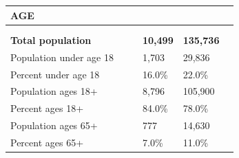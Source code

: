 \documentclass[9pt]{report}
\begin{document}
\vspace{24pt}
\setlength{\tabcolsep}{.01in} %
\begin{tabular}{p{.10in}p{.10in}p{.10in}p{3.7in}>{\hfill}p{.85in}>{\hfill}p{.85in}>{\hfill}p{.85in}>{\hfill}p{.85in}p{0.1in}}
\multicolumn{9}{l}{\parbox{7.1in}{\raggedright{\large{\strut\textbf{AGE}\strut}}}} \\ 
\hline
\multicolumn{4}{l}{\parbox{3.5in}{\raggedright{\textbf{}}}} & \multicolumn{1}{r}{\parbox{.85in}{\strut\raggedleft{\textbf{}\strut}}} & \multicolumn{1}{r}{\parbox{.85in}{\strut\raggedleft{\textbf{}\strut}}} & \multicolumn{1}{r}{\parbox{.85in}{\strut{}}} & \multicolumn{1}{r}{\parbox{.85in}{\strut{}}} & \\ 
\multicolumn{9}{l}{} \\ 
\multicolumn{4}{l}{\parbox{3.5in}{\strut\raggedright{\textbf{Total population}\strut}}} & \textbf{} & \textbf{} & \textbf{10,499} & \textbf{135,736} & \textbf{} \\ 
\multicolumn{4}{l}{\parbox{3.6in}{\strut\raggedright{{Population under age 18}}\strut}} &  &  & 1,703 & 29,836 & \multicolumn{1}{l}{}  \\ 
\multicolumn{4}{l}{\parbox{3.6in}{\strut\raggedright{{Percent under age 18}}\strut}} &  &  & 16.0\% & 22.0\% & \multicolumn{1}{l}{}  \\ 
\multicolumn{4}{l}{\parbox{3.6in}{\strut\raggedright{{Population ages 18+}}\strut}} &  &  & 8,796 & 105,900 & \multicolumn{1}{l}{}  \\ 
\multicolumn{4}{l}{\parbox{3.6in}{\strut\raggedright{{Percent ages 18+}}\strut}} &  &  & 84.0\% & 78.0\% & \multicolumn{1}{l}{}  \\ 
\multicolumn{4}{l}{\parbox{3.6in}{\strut\raggedright{{Population ages 65+}}\strut}} &  &  & 777 & 14,630 & \multicolumn{1}{l}{}  \\ 
\multicolumn{4}{l}{\parbox{3.6in}{\strut\raggedright{{Percent ages 65+}}\strut}} &  &  & 7.0\% & 11.0\% & \multicolumn{1}{l}{}  \\ 

\end{tabular}
\setlength{\tabcolsep}{6pt} %
\end{document}
